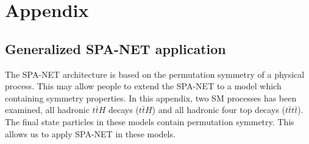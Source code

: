 

\appendix

\chapter{Appendix}\label{app}

\section{Generalized SPA-NET application}\label{sec: generalized spa-net}
The SPA-NET architecture is based on the permutation symmetry of a physical process. This may allow people to extend the SPA-NET to a model which containing symmetry properties. In this appendix, two SM processes has been examined, all hadronic $t\bar{t}H$ decays ($t\bar{t}H$) and all hadronic four top decays ($t\bar{t}t\bar{t}$). The final state particles in these models contain permutation symmetry. This allows us to apply SPA-NET in these models. 
